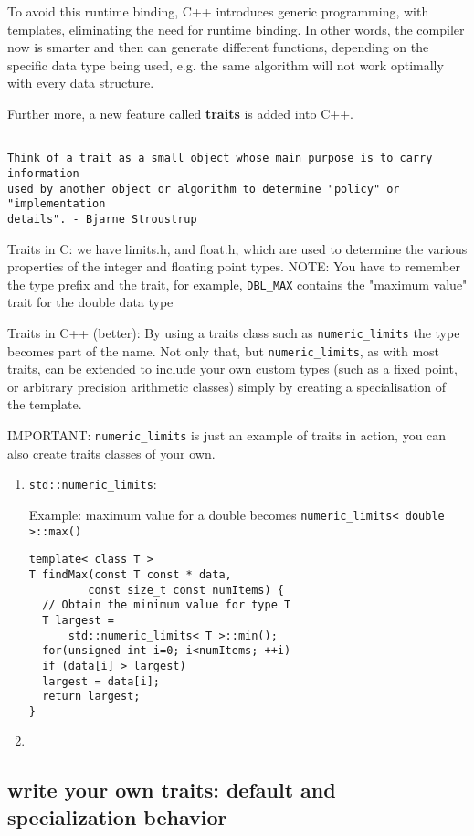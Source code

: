 To avoid this runtime binding, C++ introduces generic programming, with
templates, eliminating the need for runtime binding. In other words, the
compiler now is smarter and then can generate different functions, depending on
the specific data type being used, e.g. the same algorithm will not work
optimally with every data structure.

Further more, a new feature called {\bf traits} is added into C++.
\begin{verbatim}

Think of a trait as a small object whose main purpose is to carry information
used by another object or algorithm to determine "policy" or "implementation
details". - Bjarne Stroustrup
\end{verbatim}

Traits in C:  we have limits.h, and float.h, which are used to determine
the various properties of the integer and floating point types.
NOTE: You have to remember the type prefix and the trait, for example,
\verb!DBL_MAX! contains the "maximum value" trait for the double data type

Traits in C++ (better): By using a traits class such as \verb!numeric_limits!
the type becomes part of the name. Not only that, but \verb!numeric_limits!, as with
most traits, can be extended to include your own custom types (such as a fixed
point, or arbitrary precision arithmetic classes) simply by creating a
specialisation of the template.

IMPORTANT: \verb!numeric_limits! is just an example of traits in action, you can also 
create traits classes of your own.


\begin{enumerate}
  \item  \verb!std::numeric_limits!: 
  
  Example: maximum value for a double becomes \verb!numeric_limits< double >::max()!
\begin{lstlisting}
template< class T > 
T findMax(const T const * data, 
         const size_t const numItems) { 
  // Obtain the minimum value for type T 
  T largest = 
      std::numeric_limits< T >::min(); 
  for(unsigned int i=0; i<numItems; ++i) 
  if (data[i] > largest) 
  largest = data[i]; 
  return largest; 
} 
\end{lstlisting}

  \item 
\end{enumerate}

\subsection{write your own traits: default and specialization behavior}

